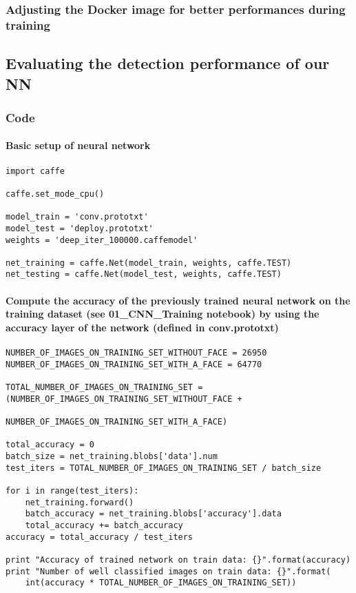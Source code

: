 \documentclass[french]{article}
\begin{document}
\subsubsection{Adjusting the Docker image for better performances during training}

\subsection{Evaluating the detection performance of our NN}

\subsubsection{Code}

\paragraph{Basic setup of neural network}

\begin{verbatim}
import caffe

caffe.set_mode_cpu()

model_train = 'conv.prototxt'
model_test = 'deploy.prototxt'
weights = 'deep_iter_100000.caffemodel'

net_training = caffe.Net(model_train, weights, caffe.TEST)
net_testing = caffe.Net(model_test, weights, caffe.TEST)
\end{verbatim}

\paragraph{Compute the accuracy of the previously trained neural network on the training dataset (see 01\_CNN\_Training notebook) by using the accuracy layer of the network (defined in conv.prototxt)}

\begin{verbatim}
NUMBER_OF_IMAGES_ON_TRAINING_SET_WITHOUT_FACE = 26950
NUMBER_OF_IMAGES_ON_TRAINING_SET_WITH_A_FACE = 64770

TOTAL_NUMBER_OF_IMAGES_ON_TRAINING_SET = (NUMBER_OF_IMAGES_ON_TRAINING_SET_WITHOUT_FACE +
                                          NUMBER_OF_IMAGES_ON_TRAINING_SET_WITH_A_FACE)

total_accuracy = 0
batch_size = net_training.blobs['data'].num
test_iters = TOTAL_NUMBER_OF_IMAGES_ON_TRAINING_SET / batch_size

for i in range(test_iters):
    net_training.forward()
    batch_accuracy = net_training.blobs['accuracy'].data
    total_accuracy += batch_accuracy
accuracy = total_accuracy / test_iters

print "Accuracy of trained network on train data: {}".format(accuracy)
print "Number of well classified images on train data: {}".format(
    int(accuracy * TOTAL_NUMBER_OF_IMAGES_ON_TRAINING_SET))
\end{verbatim}
\end{document}
